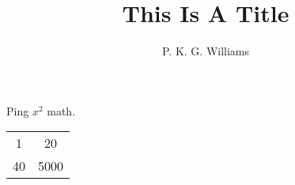 \documentclass{article}
\title{This Is A Title}
\author{P. K. G. Williams}
\begin{document}
Ping $x^2$ math.

\begin{tabular}{cc}
1 & 20 \\
40 & 5000
\end{tabular}
\end{document}
